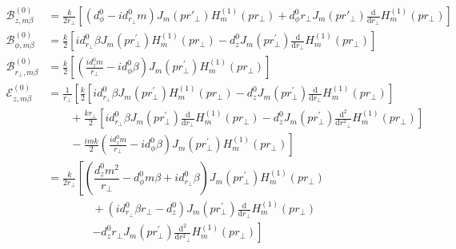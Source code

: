 \documentclass[]{report}
\begin{document}
\begin{align}
\mathcal{B}_{z,m\beta}^{(0)} &= \frac{k}{2r\!_\perp}\left[(d^0_\phi\!-\! id^0_{r\!_\perp}m) J_m(pr'\!\!_\perp)H_m^{(1)}(pr\!_\perp) \!+\! d^0_\phi r\!_\perp J_m(pr'\!_\perp) \frac{\mathrm{d}}{\mathrm{d}r\!_\perp}H_m^{(1)}(pr\!_\perp)\right]\\
\mathcal{B}_{\phi,m\beta}^{(0)} &= \frac{k}{2}\left[ id^0_{r\!_\perp}\beta J_{m}\left( {pr\!_\perp^{\prime} }\right) H_{m}^{\left( {1}\right) }\left( pr\!_\perp \right)-d^0_z J_{m}\left( {pr\!_\perp^{\prime} }\right) \frac{\mathrm{d}}{\mathrm{d}r\!_\perp}H_{m}^{\left( {1}\right) }\left( pr\!_\perp \right) \right]\\
\mathcal{B}_{r\!_\perp, m\beta}^{(0)} &= \frac{k}{2}\left[(\frac{id^0_z m}{r\!_\perp}- id^0_\phi \beta)J_{m}\left( {pr\!_\perp^{\prime} }\right) H_{m}^{\left( {1}\right) }\left( pr\!_\perp \right)   \right]\\
\mathcal{E}_{z,m\beta}^{(0)} &= \frac{1}{r\!_\perp}\left[\frac{k}{2}\left[ id^0_{r\!_\perp}\beta J_{m}\left( {pr\!_\perp^{\prime} }\right) H_{m}^{\left( {1}\right) }\left( pr\!_\perp \right)-d^0_z J_{m}\left( {pr\!_\perp^{\prime} }\right) \frac{\mathrm{d}}{\mathrm{d}r\!_\perp}H_{m}^{\left( {1}\right) }\left( pr\!_\perp \right) \right]\right.\nonumber\\
&\qquad + \frac{kr\!_\perp}{2}\left[ id^0_{r\!_\perp}\beta J_{m}\left( {pr\!_\perp^{\prime} }\right) \frac{\mathrm{d}}{\mathrm{d}r\!_\perp}H_{m}^{\left( {1}\right) }\left( pr\!_\perp \right)-d^0_z J_{m}\left( {pr\!_\perp^{\prime} }\right) \frac{\mathrm{d}^2}{\mathrm{d}r^2\!\!_\perp}H_{m}^{\left( {1}\right) }\left( pr\!_\perp \right) \right] \nonumber\\
&\qquad -\left. \frac{imk}{2}(\frac{id^0_z m}{r\!_\perp}- id^0_\phi \beta)J_{m}\left( {pr\!_\perp^{\prime} }\right) H_{m}^{\left( {1}\right) }\left( pr\!_\perp \right)  \right]\\
&= \frac{k}{2r\!_\perp}\left[ (\dfrac{d^0_z m^2}{r\!_\perp}-d^0_\phi m \beta + i d^0_{r\!_\perp}\beta)J_{m}\left( {pr\!_\perp^{\prime} }\right) H_{m}^{\left( {1}\right) }\left( pr\!_\perp \right)\right. \nonumber \\
&\qquad\qquad +(id^0_{r\!_\perp}\beta r\!_\perp -d^0_z)J_{m}\left( {pr\!_\perp^{\prime} }\right) \frac{\mathrm{d}}{\mathrm{d}r\!_\perp}H_{m}^{\left( {1}\right) }\left( pr\!_\perp \right)\nonumber\\
&\qquad\qquad \left. - d^0_z r\!_\perp J_{m}\left( {pr\!_\perp^{\prime} }\right) \frac{\mathrm{d}^2}{\mathrm{d}r^2\!\!_\perp}H_{m}^{\left( {1}\right) }\left( pr\!_\perp \right) \right]\\

\end{align}
\end{document}
